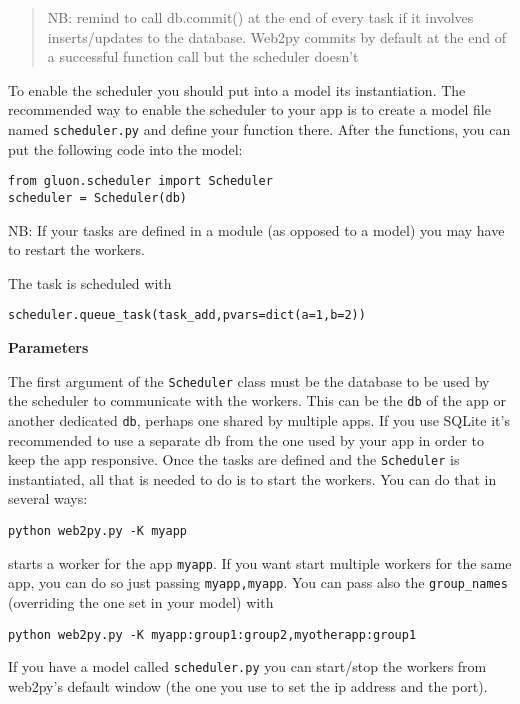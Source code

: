 \documentclass[justified,sixbynine,notoc]{tufte-book}
\def\ft{\small\tt}
\begin{document}
\begin{fullwidth}
\begin{quote}NB: remind to call db.commit() at the end of every task if it involves inserts/updates to the database. Web2py commits by default at the end of a successful function call but the scheduler doesn't\end{quote}
To enable the scheduler you should put into a model its instantiation.
The recommended way to enable the scheduler to your app is to create a model file named {\ft scheduler.py} and define your function there. After the functions, you can put the following code into the model:

\begin{lstlisting}
from gluon.scheduler import Scheduler
scheduler = Scheduler(db)
\end{lstlisting}

NB: If your tasks are defined in a module (as opposed to a model) you may have to restart the workers.

The task is scheduled with

\begin{lstlisting}
scheduler.queue_task(task_add,pvars=dict(a=1,b=2))
\end{lstlisting}

{\bf Parameters}

The first argument of the {\ft Scheduler} class must be the database to be used by the scheduler to communicate with the workers. This can be the {\ft db} of the app or another dedicated {\ft db}, perhaps one shared by multiple apps. If you use SQLite it's recommended to use a separate db from the one used by your app in order to keep the app responsive.
Once the tasks are defined and the {\ft Scheduler} is instantiated, all that is needed to do is to start the workers. You can do that in several ways:

\begin{lstlisting}
python web2py.py -K myapp
\end{lstlisting}
starts a worker for the app {\ft myapp}. If you want start multiple workers for the same app, you can do so just passing {\ft myapp,myapp}. You can pass also the {\ft group\_names} (overriding the one set in your model) with

\begin{lstlisting}
python web2py.py -K myapp:group1:group2,myotherapp:group1
\end{lstlisting}

If you have a model called {\ft scheduler.py} you can start/stop the workers from web2py's default window (the one you use to set the ip address and the port).


\end{fullwidth}
\end{document}
